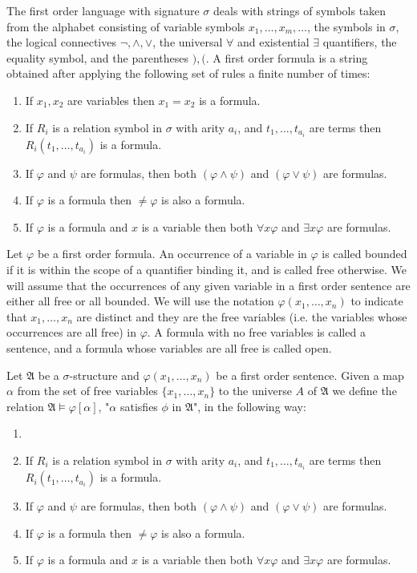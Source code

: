 \documentclass[11pt,notitlepage,a4paper]{article}
\theoremstyle{definition}
\begin{document}
The first order language with signature $\sigma$ deals with strings
of symbols taken from the alphabet consisting of
 variable symbols $x_1,\dots,x_m,\dots$, the symbols in $\sigma$,
the logical connectives $\neg, \wedge, \vee$,
the universal $\forall$ and existential $\exists$ quantifiers,
the equality symbol, and the parentheses $),($.
A first order formula is a string obtained after applying the
following set of rules a finite number of times: 
\begin{enumerate}[label=(\Roman*),itemsep=0pt, topsep=0pt]
	\item If $x_1,x_2$ are variables then $x_1=x_2$ is a formula.
	\item If $R_i$ is a relation symbol in $\sigma$ with arity $a_i$,
	and $t_1,\dots, t_{a_i}$ are terms then 
	$R_i(t_1,\dots,t_{a_i})$ is a formula.
	\item If $\varphi$ and $\psi$ are formulas, then both
	$(\varphi \wedge \psi)$ and $(\varphi \vee \psi)$ are formulas.
	\item If $\varphi$ is a formula then $\neq \varphi$ is also 
	a formula.
	\item If $\varphi$ is a formula and $x$ is a variable then both
	$\forall x \varphi$ and $\exists x\varphi$ are formulas. 
\end{enumerate} 

Let $\varphi$ be a first order formula. An occurrence of a variable 
in $\varphi$ is called bounded if it is within the scope of
a quantifier binding it, and is called free otherwise. We
will assume that the occurrences of any given variable in a first
order sentence are either all free or all bounded. 
We will use the notation $\varphi(x_1,\dots, x_n)$ to indicate
that $x_1, \dots, x_n$ are distinct and they are the free variables
(i.e. the variables whose occurrences are all free) 
in $\varphi$. A formula with no free variables is called a sentence,
and a formula whose variables are all free is called open.

Let $\mathfrak{A}$ be a $\sigma$-structure and $\varphi(x_1,\dots,x_n)$ 
be a first order sentence. Given a map $\alpha$ from the set
of free variables $\{x_1,\dots,x_n\}$ to the universe $A$ 
of $\mathfrak{A}$ we define the relation 
$\mathfrak{A} \models \varphi[\alpha]$, "$\alpha$ satisfies $\phi$ in $\mathfrak{A}$",
in the following way:
\begin{enumerate}[label=(\Roman*),itemsep=0pt, topsep=0pt]
	\item 
	\item If $R_i$ is a relation symbol in $\sigma$ with arity $a_i$,
	and $t_1,\dots, t_{a_i}$ are terms then 
	$R_i(t_1,\dots,t_{a_i})$ is a formula.
	\item If $\varphi$ and $\psi$ are formulas, then both
	$(\varphi \wedge \psi)$ and $(\varphi \vee \psi)$ are formulas.
	\item If $\varphi$ is a formula then $\neq \varphi$ is also 
	a formula.
	\item If $\varphi$ is a formula and $x$ is a variable then both
	$\forall x \varphi$ and $\exists x\varphi$ are formulas. 
\end{enumerate} 
\end{document}
